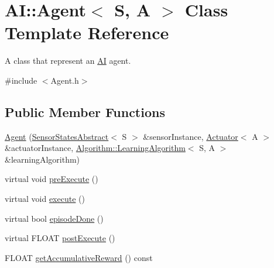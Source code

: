 \hypertarget{classAI_1_1Agent}{\section{A\-I\-:\-:Agent$<$ S, A $>$ Class Template Reference}
\label{classAI_1_1Agent}
}


A class that represent an \hyperlink{namespaceAI}{A\-I} agent.  




{\ttfamily \#include $<$Agent.\-h$>$}

\subsection*{Public Member Functions}
\begin{DoxyCompactItemize}
\item 
\hyperlink{classAI_1_1Agent_a2cab0b2534dc40185a3e2f9a858e8023}{Agent} (\hyperlink{classAI_1_1SensorStatesAbstract}{Sensor\-States\-Abstract}$<$ S $>$ \&sensor\-Instance, \hyperlink{classAI_1_1Actuator}{Actuator}$<$ A $>$ \&actuator\-Instance, \hyperlink{classAI_1_1Algorithm_1_1LearningAlgorithm}{Algorithm\-::\-Learning\-Algorithm}$<$ S, A $>$ \&learning\-Algorithm)
\item 
virtual void \hyperlink{classAI_1_1Agent_a938963e5cbbd862402a4b815b9327093}{pre\-Execute} ()
\item 
virtual void \hyperlink{classAI_1_1Agent_a4c1fa5a86e2baa6510fb1448baff8b83}{execute} ()
\item 
virtual bool \hyperlink{classAI_1_1Agent_a65523b33cc9ca3da9200550ecd0a90e0}{episode\-Done} ()
\item 
virtual F\-L\-O\-A\-T \hyperlink{classAI_1_1Agent_ae93d7ac5e75646b0965f18fd9c6a1737}{post\-Execute} ()
\item 
F\-L\-O\-A\-T \hyperlink{classAI_1_1Agent_a86266ab330105f0eabda91d9706133de}{get\-Accumulative\-Reward} () const 
\end{DoxyCompactItemize}
